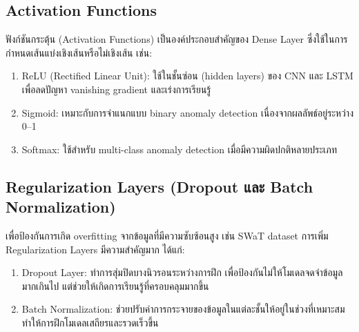 \subsection{Activation Functions}
\hspace{2em} ฟังก์ชันกระตุ้น (Activation Functions) เป็นองค์ประกอบสำคัญของ Dense Layer ซึ่งใช้ในการกำหนดเส้นแบ่งเชิงเส้นหรือไม่เชิงเส้น เช่น:
\begin{enumerate}
  \item ReLU (Rectified Linear Unit): ใช้ในชั้นซ่อน (hidden layers) ของ CNN และ LSTM เพื่อลดปัญหา vanishing gradient และเร่งการเรียนรู้
  \item Sigmoid: เหมาะกับการจำแนกแบบ binary anomaly detection เนื่องจากผลลัพธ์อยู่ระหว่าง 0–1
  \item Softmax: ใช้สำหรับ multi-class anomaly detection เมื่อมีความผิดปกติหลายประเภท
\end{enumerate}

\subsection{Regularization Layers (Dropout และ Batch Normalization)}
\hspace{2em} เพื่อป้องกันการเกิด overfitting จากข้อมูลที่มีความซับซ้อนสูง เช่น SWaT dataset การเพิ่ม Regularization Layers มีความสำคัญมาก ได้แก่:
\begin{enumerate}
  \item Dropout Layer: ทำการสุ่มปิดบางนิวรอนระหว่างการฝึก เพื่อป้องกันไม่ให้โมเดลจดจำข้อมูลมากเกินไป แต่ช่วยให้เกิดการเรียนรู้ที่ครอบคลุมมากขึ้น
  \item Batch Normalization: ช่วยปรับค่าการกระจายของข้อมูลในแต่ละชั้นให้อยู่ในช่วงที่เหมาะสม ทำให้การฝึกโมเดลเสถียรและรวดเร็วขึ้น
\end{enumerate}

